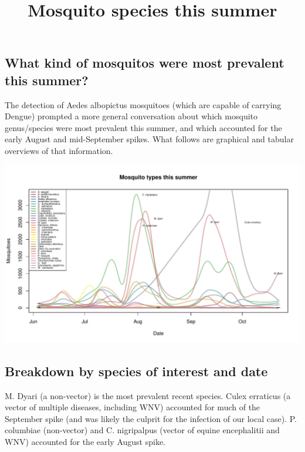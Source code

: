 \documentclass{article}
\title{Mosquito species this summer}
\begin{document}


\begin{center}
\subsection*{What kind of mosquitos were most prevalent this summer?}
\end{center}
The detection of Aedes albopictus mosquitoes (which are capable of carrying Dengue) prompted a more general conversation about which mosquito genus/species were most prevalent this summer, and which accounted for the early August and mid-September spikes.  What follows are graphical and tabular overviews of that information.
\begin{center}
\includegraphics{mosq29octtype-002}
\subsection*{Breakdown by species of interest and date}
M. Dyari (a non-vector) is the most prevalent recent species.  Culex erraticus (a vector of multiple diseases, including WNV) accounted for much of the September spike (and was likely the culprit for the infection of our local case).  P. columbiae (non-vector) and C. nigripalpus (vector of equine encephalitii and WNV) accounted for the early August spike.

\begin{small}


\end{small}
\end{center}
\end{document}
